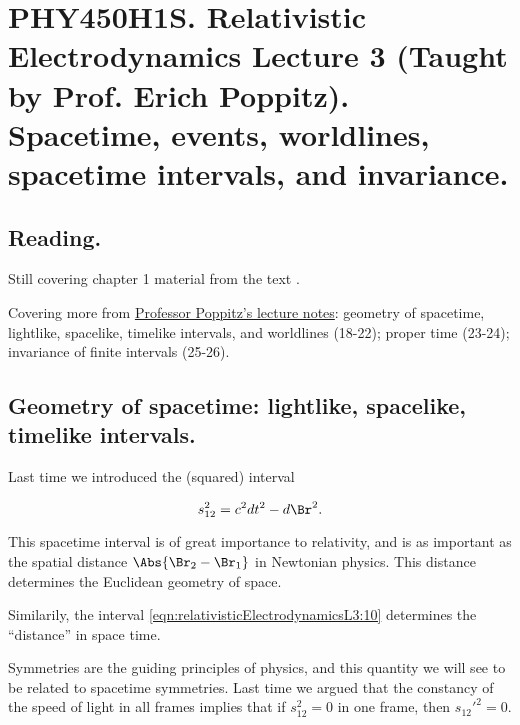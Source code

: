 
%

\chapter{PHY450H1S.  Relativistic Electrodynamics Lecture 3 (Taught by Prof. Erich Poppitz).  Spacetime, events, worldlines, spacetime intervals, and invariance.}
\label{chap:relativisticElectrodynamicsL3}
{}
\date{Jan 13, 2011}

\beginArtNoToc

\section{Reading.}

Still covering chapter 1 material from the text \cite{landau1980classical}.

Covering more from \href{http://www.physics.utoronto.ca/~poppitz/e-poppitz/PHY450_files/RelEM12-26.pdf}{Professor Poppitz's lecture notes}: geometry of spacetime, lightlike, spacelike, timelike intervals, and worldlines (18-22); proper time (23-24); invariance of finite intervals (25-26).

\section{Geometry of spacetime: lightlike, spacelike, timelike intervals.}

Last time we introduced the (squared) interval

\begin{equation}\label{eqn:relativisticElectrodynamicsL3:10}
s_{12}^2 = c^2 dt^2 - d\Br^2.
\end{equation}

This spacetime interval is of great importance to relativity, and is as important as the spatial distance $\Abs{\Br_2 -\Br_1}$ in Newtonian physics.  This distance determines the Euclidean geometry of space.

Similarily, the interval \ref{eqn:relativisticElectrodynamicsL3:10} determines the ``distance'' in space time.

Symmetries are the guiding principles of physics, and this quantity we will see to be related to spacetime symmetries.  Last time we argued that the constancy of the speed of light in all frames implies that if $s_{12}^2 = 0$ in one frame, then ${s_{12}'}^2 = 0$.


